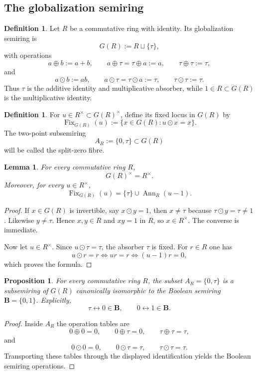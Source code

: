 \documentclass[11pt,a4paper]{article}
\newtheorem{proposition}[theorem]{Proposition}
\newtheorem{lemma}[theorem]{Lemma}
\theoremstyle{definition}
\newtheorem{definition}[theorem]{Definition}
\theoremstyle{remark}
\DeclareMathOperator{\Fix}{Fix}
\DeclareMathOperator{\Ann}{Ann}
\newcommand{\BB}{\mathbf B}
\newcommand{\taup}{\tau}
\begin{document}
\subsection{The globalization semiring}

\begin{definition}
Let $R$ be a commutative ring with identity. Its globalization semiring is
\[
G(R):=R\sqcup\{\taup\},
\]
with operations
\[
a\oplus b:=a+b,
\qquad
 a\oplus\taup=\taup\oplus a:=a,
\qquad
 \taup\oplus\taup:=\taup,
\]
and
\[
a\odot b:=ab,
\qquad
 a\odot\taup=\taup\odot a:=\taup,
\qquad
 \taup\odot\taup:=\taup.
\]
Thus $\taup$ is the additive identity and multiplicative absorber, while $1\in R\subset G(R)$ is the multiplicative identity.
\end{definition}

\begin{definition}
For $u\in R^\times\subset G(R)^\times$, define its fixed locus in $G(R)$ by
\[
\Fix_{G(R)}(u):=\{x\in G(R):u\odot x=x\}.
\]
The two-point subsemiring
\[
A_R:=\{0,\taup\}\subset G(R)
\]
will be called the split-zero fibre.
\end{definition}

\begin{lemma}\label{lem:units-fix}
For every commutative ring $R$,
\[
G(R)^\times=R^\times.
\]
Moreover, for every $u\in R^\times$,
\[
\Fix_{G(R)}(u)=\{\taup\}\cup \Ann_R(u-1).
\]
\end{lemma}

\begin{proof}
If $x\in G(R)$ is invertible, say $x\odot y=1$, then $x\neq \taup$ because $\taup\odot y=\taup\neq1$. Likewise $y\neq\taup$. Hence $x,y\in R$ and $xy=1$ in $R$, so $x\in R^\times$. The converse is immediate.

Now let $u\in R^\times$. Since $u\odot\taup=\taup$, the absorber $\taup$ is fixed. For $r\in R$ one has
\[
u\odot r=r \iff ur=r \iff (u-1)r=0,
\]
which proves the formula.
\end{proof}

\begin{proposition}\label{prop:boolean-pair}
For every commutative ring $R$, the subset $A_R=\{0,\taup\}$ is a subsemiring of $G(R)$ canonically isomorphic to the Boolean semiring $\BB=\{0,1\}$. Explicitly,
\[
\taup\longleftrightarrow 0\in\BB,
\qquad
0\longleftrightarrow 1\in\BB.
\]
\end{proposition}

\begin{proof}
Inside $A_R$ the operation tables are
\[
0\oplus0=0,
\qquad
0\oplus\taup=0,
\qquad
\taup\oplus\taup=\taup,
\]
and
\[
0\odot0=0,
\qquad
0\odot\taup=\taup,
\qquad
\taup\odot\taup=\taup.
\]
Transporting these tables through the displayed identification yields the Boolean semiring operations.
\end{proof}
\end{document}
